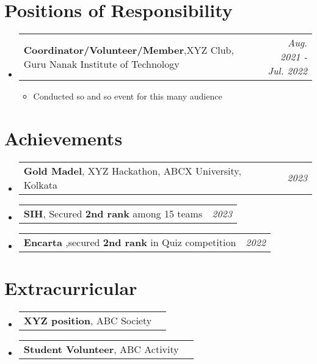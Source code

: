 \documentclass[a4paper,11pt]{article}
\makeatletter
\newcommand{\resumePOR}[3]{
\vspace{0.5mm}\item
    \begin{tabular*}{0.97\textwidth}[t]{l@{\extracolsep{\fill}}r}
        \textbf{#1},\hspace{0.3mm}#2 & \textit{\small{#3}} 
    \end{tabular*}
    \vspace{-2mm}
}
\newcommand{\resumeSubHeadingListStart}{\begin{itemize}[leftmargin=*,labelsep=0mm]}
\newcommand{\resumeItemListStart}{\begin{justify}\begin{itemize}[leftmargin=3ex, rightmargin=2ex, noitemsep,labelsep=1.2mm,itemsep=0mm]\small}
\newcommand{\resumeSubHeadingListEnd}{\end{itemize}\vspace{2mm}}
\newcommand{\resumeItemListEnd}{\end{itemize}\end{justify}\vspace{-2mm}}
\makeatother
\begin{document}
\section{Positions of Responsibility}
\vspace{-0.4mm}
\resumeSubHeadingListStart
\resumePOR{Coordinator/Volunteer/Member} %
    {XYZ Club, Guru Nanak Institute of Technology} %
    {Aug. 2021 - Jul. 2022} %
    \resumeItemListStart
        \item { Conducted so and so event for this many audience}
    \resumeItemListEnd
\resumeSubHeadingListEnd
\vspace{-6mm}

\section{Achievements}
\vspace{-0.2mm}
\resumeSubHeadingListStart
\resumePOR{Gold Madel} %
    { XYZ Hackathon, ABCX University, Kolkata \color{blue}{\href{https://example.com}{Certificate}} } %
    {2023} %
\resumePOR{SIH} %
    { Secured \textbf{2nd rank} among 15 teams \color{blue}{\href{https://example.com}{Certificate}} } %
    {2023} %
\resumePOR{Encarta } %
    {secured \textbf{2nd rank} in Quiz competition \color{blue}{\href{https://example.com}{Certificate}} } %
    {2022} %

\resumeSubHeadingListEnd
\vspace{-2mm}
\section{Extracurricular}
\vspace{-0.4mm}
\resumeSubHeadingListStart
\resumePOR{XYZ position} %
    { ABC Society} %
    {} %
\resumePOR{Student Volunteer} %
    { ABC Activity} %
    {} %
\resumeSubHeadingListEnd
\vspace{-4mm}

\end{document}
